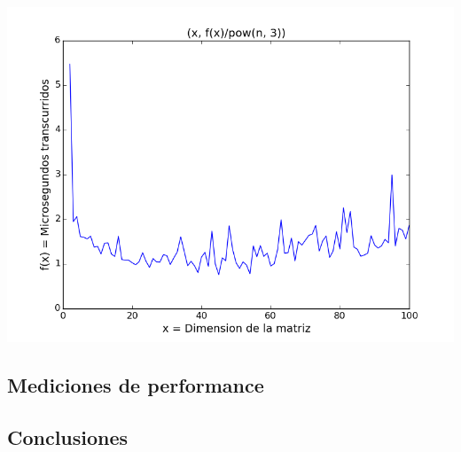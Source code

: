 \begin{center}
\includegraphics[scale=0.54]{images/4potenciasobrecubo}
\end{center}


\subsection{Mediciones de performance} \label{ej_3:performance}

\subsection{Conclusiones} \label{ej_3:conclusiones}

